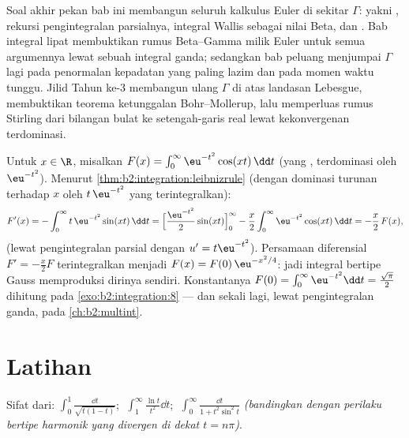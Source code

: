 \begin{remark}
Soal akhir pekan bab ini membangun seluruh kalkulus Euler di sekitar
$\Gamma$: yakni , rekursi pengintegralan parsialnya,
integral Wallis sebagai nilai Beta, dan . Bab
integral lipat membuktikan rumus Beta--Gamma milik Euler untuk semua
argumennya lewat sebuah integral ganda; sedangkan bab peluang menjumpai
$\Gamma$ lagi pada penormalan kepadatan yang paling lazim dan pada momen
waktu tunggu. Jilid Tahun ke-3 membangun ulang $\Gamma$ di atas landasan
Lebesgue, membuktikan teorema ketunggalan Bohr--Mollerup, lalu
memperluas rumus Stirling dari bilangan bulat ke setengah-garis real
lewat kekonvergenan terdominasi.
\end{remark}

\begin{example}\label{ex:b2:integration:laplace}
Untuk $x \in \R$, misalkan $F(x) = \int_0^{\infty}
\eu^{-t^2}\cos(xt)\,\dd t$ (yang  , terdominasi oleh
$\eu^{-t^2}$). Menurut \cref{thm:b2:integration:leibnizrule} (dengan
dominasi turunan terhadap $x$ oleh $t\,\eu^{-t^2}$ yang terintegralkan):
\[
F'(x) = -\int_0^\infty t\,\eu^{-t^2}\sin(xt)\,\dd t
= \Bigl[\frac{\eu^{-t^2}}{2}\sin(xt)\Bigr]_0^\infty
- \frac x2\int_0^\infty \eu^{-t^2}\cos(xt)\,\dd t
= -\frac x2\,F(x),
\]
(lewat pengintegralan parsial dengan $u' = t\eu^{-t^2}$). Persamaan
diferensial $F' = -\frac x2 F$ terintegralkan menjadi $F(x) =
F(0)\,\eu^{-x^2/4}$: jadi integral bertipe Gauss memproduksi dirinya
sendiri. Konstantanya $F(0) = \int_0^\infty \eu^{-t^2}\dd t =
\frac{\sqrt\pi}{2}$ dihitung pada \cref{exo:b2:integration:8} --- dan
sekali lagi, lewat pengintegralan ganda, pada \cref{ch:b2:multint}.
\end{example}

\section{Latihan}

\begin{exercise}[$\star$]\label{exo:b2:integration:1}
Sifat dari:
$\displaystyle\int_0^1 \frac{\dd t}{\sqrt{t(1-t)}}$;
$\;\displaystyle\int_1^\infty \frac{\ln t}{t^2}\dd t$;
$\;\displaystyle\int_0^\infty \frac{\dd t}{1 + t^2\sin^2 t}$
\emph{(bandingkan dengan perilaku bertipe harmonik yang divergen di
dekat $t = n\pi$)}.
\end{exercise}

